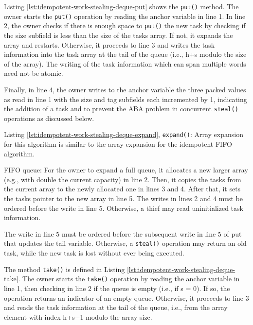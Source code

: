 Listing \ref{lst:idempotent-work-stealing-deque-put} shows the
\lstinline!put()! method. The owner starts the \lstinline!put()!
operation by reading the anchor variable in line 1. In line 2, the
owner checks if there is enough space to \lstinline!put()! the new
task by checking if the size subfield is less than the size of the
tasks array. If not, it expands the array and restarts. Otherwise, it
proceeds to line 3 and writes the task information into the task array
at the tail of the queue (i.e., h+s modulo the size of the array). The
writing of the task information which can span multiple words need not
be atomic.

Finally, in line 4, the owner writes to the anchor variable the three
packed values as read in line 1 with the size and tag subfields each
incremented by 1, indicating the addition of a task and to prevent
the ABA problem in concurrent \lstinline!steal()! operations as
discussed below.



Listing \ref{lst:idempotent-work-stealing-deque-expand},
\lstinline!expand()!: Array expansion for this algorithm is similar to
the array expansion for the idempotent FIFO algorithm.

FIFO queue: For the owner to expand a full queue, it allocates a new
larger array (e.g., with double the current capacity) in line 2. Then,
it copies the tasks from the current array to the newly allocated one
in lines 3 and 4. After that, it sets the tasks pointer to the new
array in line 5. The writes in lines 2 and 4 must be ordered before
the write in line 5. Otherwise, a thief may read uninitialized task
information.

The write in line 5 must be ordered before the subsequent write in
line 5 of put that updates the tail variable. Otherwise, a
\lstinline!steal()! operation may return an old task, while the new
task is lost without ever being executed.



The method \lstinline!take()! is defined in Listing
\ref{lst:idempotent-work-stealing-deque-take}. The owner starts the
\lstinline!take()! operation by reading the anchor variable in line
1, then checking in line 2 if the queue is empty (i.e., if s = 0). If
so, the operation returns an indicator of an empty queue. Otherwise,
it proceeds to line 3 and reads the task information at the tail of
the queue, i.e., from the array element with index h+s−1 modulo the
array size.

